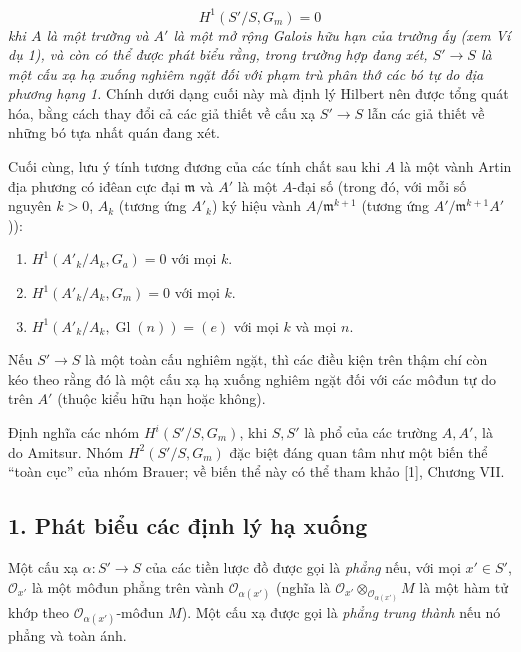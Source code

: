 \[
  H^1(S'/S,G_m)=0
\]
\emph{khi $A$ là một trường và $A'$ là một mở rộng Galois hữu hạn của trường ấy
(xem Ví dụ 1), và còn có thể được phát biểu rằng, trong trường hợp đang xét,
$S'\longrightarrow S$ là một cấu xạ hạ xuống nghiêm ngặt đối với phạm trù phân
thớ các bó tự do địa phương hạng 1.} Chính dưới dạng cuối này mà định lý Hilbert
nên được tổng quát hóa, bằng cách thay đổi cả các giả thiết về cấu xạ
$S'\longrightarrow S$ lẫn các giả thiết về những bó tựa nhất quán đang xét.

Cuối cùng, lưu ý tính tương đương của các tính chất sau khi $A$ là một vành
Artin địa phương có iđêan cực đại $\mathfrak m$ và $A'$ là một $A$-đại số
(trong đó, với mỗi số nguyên $k>0$, $A_k$ (tương ứng $A'_k$) ký hiệu vành
$A/\mathfrak m^{k+1}$ (tương ứng $A'/\mathfrak m^{k+1}A'$)):
\begin{enumerate}
\item[(i)] $H^1(A'_k/A_k,G_a)=0$ với mọi $k$.
\item[(ii)] $H^1(A'_k/A_k,G_m)=0$ với mọi $k$.
\item[(iii)] $H^1(A'_k/A_k,\operatorname{Gl}(n))=(e)$ với mọi $k$ và mọi
$n$.
\end{enumerate}
Nếu $S'\longrightarrow S$ là một toàn cấu nghiêm ngặt, thì các điều kiện trên
thậm chí còn kéo theo rằng đó là một cấu xạ hạ xuống nghiêm ngặt đối với các
môđun tự do trên $A'$ (thuộc kiểu hữu hạn hoặc không).

 Định nghĩa các nhóm $H^i(S'/S,G_m)$, khi $S,S'$ là phổ của
các trường $A,A'$, là do Amitsur. Nhóm $H^2(S'/S,G_m)$ đặc biệt đáng quan tâm
như một biến thể “toàn cục” của nhóm Brauer; về biến thể này có thể tham khảo
[1], Chương VII.


\subsection*{1. Phát biểu các định lý hạ xuống}

 Một cấu xạ
$\alpha:S'\longrightarrow S$ của các tiền lược đồ được gọi là \emph{phẳng} nếu,
với mọi $x'\in S'$, $\mathcal O_{x'}$ là một môđun phẳng trên vành
$\mathcal O_{\alpha(x')}$ (nghĩa là
$\mathcal O_{x'}\otimes_{\mathcal O_{\alpha(x')}}M$ là một hàm tử khớp theo
$\mathcal O_{\alpha(x')}$-môđun $M$). Một cấu xạ được gọi là \emph{phẳng trung
thành} nếu nó phẳng và toàn ánh.

